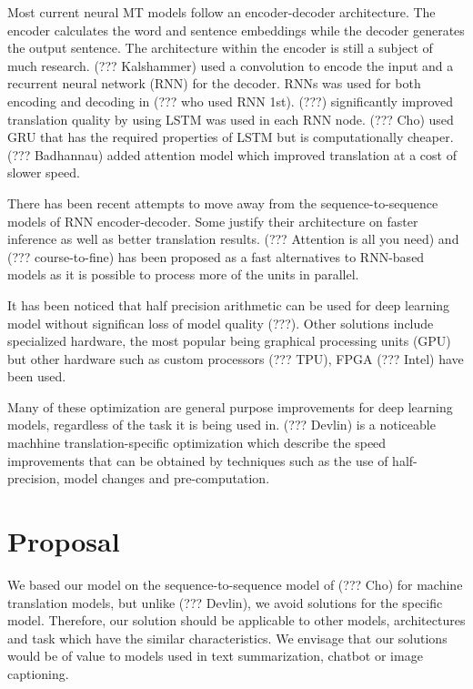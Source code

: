 \documentclass[]{article}
\begin{document}
Most current neural MT models follow an encoder-decoder architecture. The encoder calculates the word and sentence embeddings while the decoder generates the output sentence. The architecture within the encoder is still a subject of much research. (??? Kalshammer) used a convolution to encode the input and a recurrent neural network (RNN) for the decoder. RNNs was used for both encoding and decoding in (??? who used RNN 1st). (???) significantly improved translation quality by using LSTM was used in each RNN node. (??? Cho) used GRU that has the required properties of LSTM but is computationally cheaper. (??? Badhannau) added attention model which improved translation at a cost of slower speed.

There has been recent attempts to move away from the sequence-to-sequence models of RNN encoder-decoder. Some justify their architecture on faster inference as well as better translation results. (??? Attention is all you need) and (??? course-to-fine) has been proposed as a fast alternatives to RNN-based models as it is possible to process more of the units in parallel.

It has been noticed that half precision arithmetic can be used for deep learning model without significan loss of model quality (???). Other solutions include specialized hardware, the most popular being graphical processing units (GPU) but other hardware such as custom processors (??? TPU), FPGA (??? Intel) have been used. 

Many of these optimization are general purpose improvements for deep learning models, regardless of the task it is being used in. (??? Devlin) is a noticeable machhine translation-specific optimization which describe the speed improvements that can be obtained by techniques such as the use of half-precision, model changes and pre-computation.

\section{Proposal}
\label{sec:Proposal}

We based our model on the sequence-to-sequence model of (??? Cho) for machine translation models, but unlike (??? Devlin), we avoid solutions for the specific model. Therefore, our solution should be applicable to other models, architectures and task which have the similar characteristics. We envisage that our solutions would be of value to models used in text summarization, chatbot or image captioning.
\end{document}
